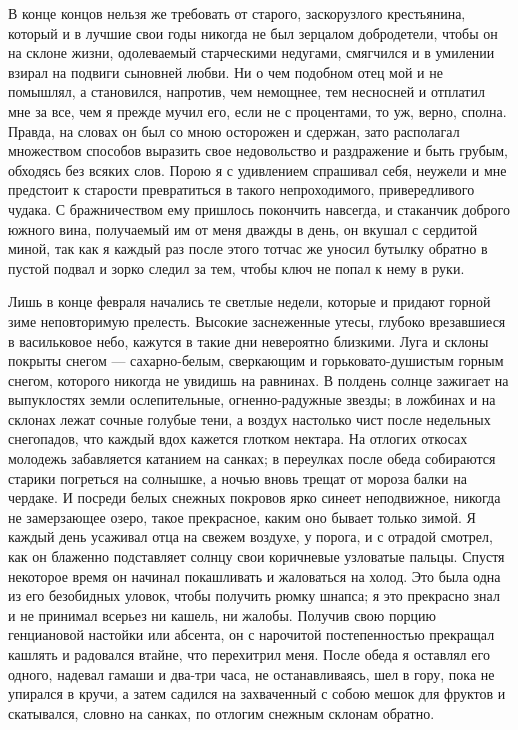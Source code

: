 В  конце   концов  нельзя   же  требовать  от   старого,  заскорузлого
крестьянина,  который и  в лучшие  свои годы  никогда не  был зерцалом
добродетели,  чтобы  он  на   склоне  жизни,  одолеваемый  старческими
недугами, смягчился и в умилении  взирал на подвиги сыновней любви. Ни
о чем  подобном отец мой  и не  помышлял, а становился,  напротив, чем
немощнее, тем несносней и отплатил мне за все, чем я прежде мучил его,
если не с  процентами, то уж, верно, сполна. Правда,  на словах он был
со  мною  осторожен и  сдержан,  зато  располагал множеством  способов
выразить  свое  недовольство и  раздражение  и  быть грубым,  обходясь
без  всяких  слов.  Порою  я  с  удивлением  спрашивал  себя,  неужели
и  мне  предстоит  к  старости превратиться  в  такого  непроходимого,
привередливого   чудака.  С   бражничеством  ему   пришлось  покончить
навсегда,  и стаканчик  доброго  южного вина,  получаемый  им от  меня
дважды в день, он вкушал с сердитой  миной, так как я каждый раз после
этого тотчас же уносил бутылку обратно  в пустой подвал и зорко следил
за тем, чтобы ключ не попал к нему в руки.

Лишь в  конце февраля  начались те светлые  недели, которые  и придают
горной зиме неповторимую прелесть.  Высокие заснеженные утесы, глубоко
врезавшиеся  в  васильковое  небо,  кажутся  в  такие  дни  невероятно
близкими. Луга  и склоны покрыты снегом  --- сахарно-белым, сверкающим
и  горьковато-душистым  горным  снегом, которого  никогда  не  увидишь
на  равнинах.   В  полдень   солнце  зажигает  на   выпуклостях  земли
ослепительные,  огненно-радужные  звезды;  в  ложбинах  и  на  склонах
лежат сочные  голубые тени,  а воздух  настолько чист  после недельных
снегопадов,  что  каждый  вдох  кажется глотком  нектара.  На  отлогих
откосах  молодежь забавляется  катанием на  санках; в  переулках после
обеда собираются старики  погреться на солнышке, а  ночью вновь трещат
от  мороза балки  на чердаке.  И посреди  белых снежных  покровов ярко
синеет неподвижное,  никогда не  замерзающее озеро,  такое прекрасное,
каким оно бывает  только зимой. Я каждый день усаживал  отца на свежем
воздухе, у  порога, и с  отрадой смотрел, как он  блаженно подставляет
солнцу  свои коричневые  узловатые пальцы.  Спустя некоторое  время он
начинал  покашливать и  жаловаться  на  холод. Это  была  одна из  его
безобидных уловок, чтобы получить рюмку шнапса; я это прекрасно знал и
не  принимал  всерьез  ни  кашель,  ни  жалобы.  Получив  свою  порцию
генциановой  настойки  или  абсента,  он  с  нарочитой  постепенностью
прекращал  кашлять  и радовался  втайне,  что  перехитрил меня.  После
обеда  я  оставлял его  одного,  надевал  гамаши  и два-три  часа,  не
останавливаясь, шел в гору, пока не  упирался в кручи, а затем садился
на  захваченный с  собою мешок  для  фруктов и  скатывался, словно  на
санках, по отлогим снежным склонам обратно.

